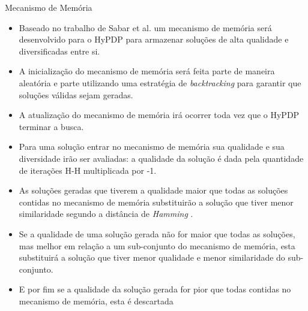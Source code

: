\begin{frame}[allowframebreaks]{Mecanismo de Memória}	
	
	\begin{itemize}
		\item Baseado no trabalho de Sabar et al. \cite{sabar2015automatic} um mecanismo de memória será desenvolvido para o HyPDP para armazenar soluções de alta qualidade e diversificadas entre si.
		\item A inicialização do mecanismo de memória será feita parte de maneira aleatória e parte utilizando uma estratégia de \textit{backtracking} para garantir que soluções válidas sejam geradas.
		\item A atualização do mecanismo de memória irá ocorrer toda vez que o HyPDP terminar a busca. 
		\item Para uma solução entrar no mecanismo de memória sua qualidade e sua diversidade irão ser avaliadas: a qualidade da solução é dada pela quantidade de iterações H-H multiplicada por -1.
		\item  As soluções geradas que tiverem a qualidade maior que todas as soluções contidas no mecanismo de memória substituirão a solução que tiver menor similaridade segundo a distância de \textit{Hamming} \cite{hamming1950error}.
		\item Se a qualidade de uma solução gerada não for maior que todas as soluções, mas melhor em relação a um sub-conjunto do mecanismo de memória, esta substituirá a solução que tiver menor qualidade e menor similaridade do sub-conjunto.
		\item E
		por fim se a qualidade da solução gerada for pior que todas contidas no mecanismo de
		memória, esta é descartada
		
			
	\end{itemize}
	
\end{frame}



